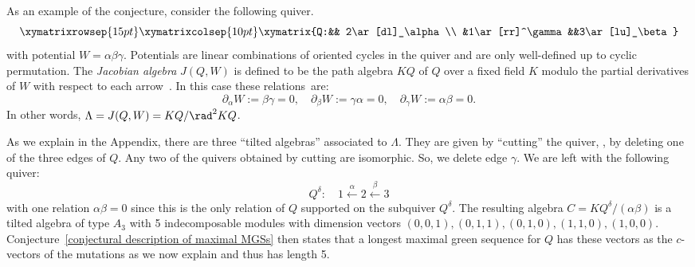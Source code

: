 As an example of the conjecture, consider the following quiver.
\[
\xymatrixrowsep{15pt}\xymatrixcolsep{10pt}
\xymatrix{%
Q:&& 2\ar[dl]_\alpha\\
&1\ar[rr]^\gamma &&3\ar[lu]_\beta
	}%
\]
with potential $W=\alpha\beta\gamma$. Potentials are linear combinations of oriented cycles in the quiver and are only well-defined up to cyclic permutation. The \emph{Jacobian algebra} $J(Q,W)$ is defined to be the path algebra $KQ$ of $Q$ over a fixed field $K$ modulo the partial derivatives of $W$ with respect to each arrow~\cite{DWZ1}. In this case these relations~are:
\[
	\partial_\alpha W:=\beta\gamma=0,\quad \partial_\beta W:=\gamma\alpha=0,\quad \partial_\gamma W:=\alpha\beta=0.
\]
In other words, $\Lambda=J(Q,W)=KQ/\rad ^2KQ$. 

As we explain in the Appendix, there are three ``tilted algebras'' associated to $\Lambda$. They are given by ``cutting'' the quiver, \ie, by deleting one of the three edges of $Q$. Any two of the quivers obtained by cutting are isomorphic. So, we delete edge $\gamma$. We are left with the following quiver:
\[
	Q^\delta:\quad 1\xleftarrow\alpha 2\xleftarrow\beta 3
\]
with one relation $\alpha\beta=0$ since this is the only relation of $Q$ supported on the subquiver $Q^\delta$. The resulting algebra $C=KQ^\delta/(\alpha\beta)$ is a tilted algebra of type $A_3$ with 5 indecomposable modules with dimension vectors $(0,0,1), (0,1,1), (0,1,0), (1,1,0), (1,0,0)$. Conjecture~\ref{conjectural description of maximal MGSs} then states that a longest maximal green sequence for $Q$ has these vectors as the $c$-vectors of the mutations as we now explain and thus has length 5.

